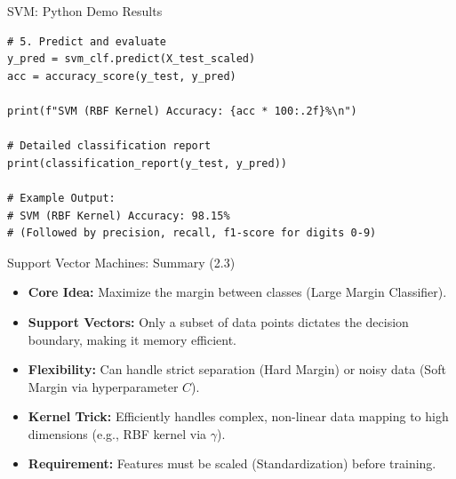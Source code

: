\documentclass[aspectratio=169]{beamer}
\begin{document}
\begin{frame}[fragile]{SVM: Python Demo Results}
\begin{verbatim}
# 5. Predict and evaluate
y_pred = svm_clf.predict(X_test_scaled)
acc = accuracy_score(y_test, y_pred)

print(f"SVM (RBF Kernel) Accuracy: {acc * 100:.2f}%\n")

# Detailed classification report
print(classification_report(y_test, y_pred))

# Example Output:
# SVM (RBF Kernel) Accuracy: 98.15%
# (Followed by precision, recall, f1-score for digits 0-9)
\end{verbatim}
\end{frame}

\begin{frame}{Support Vector Machines: Summary (2.3)}
    \begin{itemize}
        \item \textbf{Core Idea:} Maximize the margin between classes (Large Margin Classifier).
        \item \textbf{Support Vectors:} Only a subset of data points dictates the decision boundary, making it memory efficient.
        \item \textbf{Flexibility:} Can handle strict separation (Hard Margin) or noisy data (Soft Margin via hyperparameter $C$).
        \item \textbf{Kernel Trick:} Efficiently handles complex, non-linear data mapping to high dimensions (e.g., RBF kernel via $\gamma$).
        \item \textbf{Requirement:} Features must be scaled (Standardization) before training.
    \end{itemize}
\end{frame}
\end{document}

